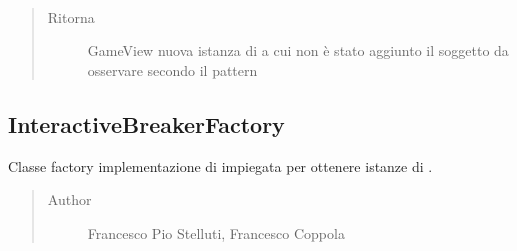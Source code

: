 \documentclass[letterpaper,10pt,italian,openany,oneside]{sphinxmanual}
\begin{document}
\begin{fulllineitems}
\label{\detokenize{source/it/unicam/cs/pa/mastermind/factories/GameViewFactory:it.unicam.cs.pa.mastermind.factories.GameViewFactory.getNewInstance()}}~\begin{quote}\begin{description}
\item[{Ritorna}] \leavevmode
GameView nuova istanza di  a cui non è stato aggiunto il soggetto da osservare secondo il pattern 

\end{description}\end{quote}

\end{fulllineitems}



\subsection{InteractiveBreakerFactory}
\label{\detokenize{source/it/unicam/cs/pa/mastermind/factories/InteractiveBreakerFactory:interactivebreakerfactory}}\label{\detokenize{source/it/unicam/cs/pa/mastermind/factories/InteractiveBreakerFactory::doc}}

\begin{fulllineitems}
\label{\detokenize{source/it/unicam/cs/pa/mastermind/factories/InteractiveBreakerFactory:it.unicam.cs.pa.mastermind.factories.InteractiveBreakerFactory}}
Classe factory implementazione di  impiegata per ottenere istanze di .
\begin{quote}\begin{description}
\item[{Author}] \leavevmode
Francesco Pio Stelluti, Francesco Coppola

\end{description}\end{quote}

\end{fulllineitems}
\end{document}
